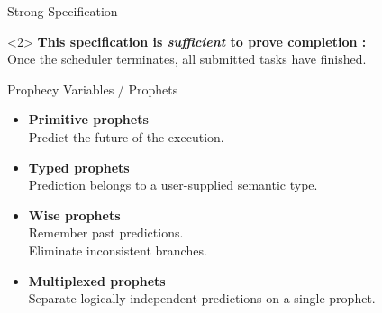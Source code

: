 \begin{frame}{Strong Specification}
\begin{overbox}<2>
  \large
  \textbf{This specification is \emph{sufficient} to prove completion :} \\
  Once the scheduler terminates, all submitted tasks have finished.
\end{overbox}
\end{frame}

\begin{frame}{Prophecy Variables / Prophets}
\large
\begin{itemize}
  \setlength\itemsep{1em}
  \item
    \textbf{Primitive prophets} \\
    Predict the future of the execution.
  \item
    \textbf{Typed prophets} \\
    Prediction belongs to a user-supplied semantic type.
  \item
    \textbf{\textcolor{color2}{Wise prophets}} \\
    Remember past predictions. \\
    Eliminate inconsistent branches.
  \item
    \textbf{\textcolor{color2}{Multiplexed prophets}} \\
    Separate logically independent predictions on a single prophet.
\end{itemize}
\end{frame}

